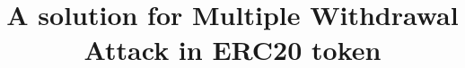 \documentclass[compsoc, conference, a4paper, 10pt, times]{IEEEtran}
\begin{document}
\title{A solution for Multiple Withdrawal Attack in ERC20 token}
\author{
	\IEEEauthorblockN{                  }
	\IEEEauthorblockA{                  }
}

\maketitle
\thispagestyle{fancy}
\pagestyle{fancy}
\IEEEpubidadjcol


\IEEEpeerreviewmaketitle






\footnotesize

\end{document}
